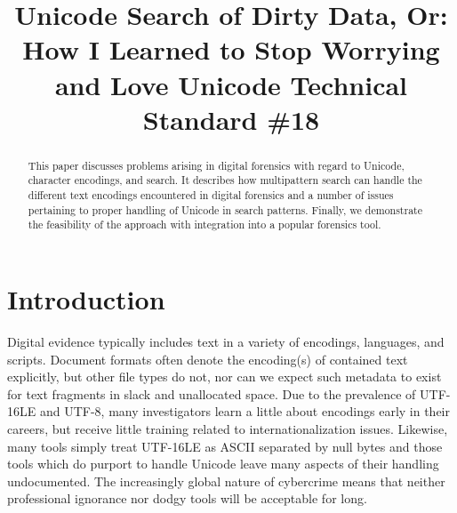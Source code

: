 \documentclass[5p,final,number,sort&compress]{elsarticle}
\begin{document}
\begin{frontmatter}

\title{Unicode Search of Dirty Data, Or:\\ How I Learned to Stop Worrying and Love Unicode Technical Standard \#18}

%
%

\begin{abstract}
This paper discusses problems arising in digital forensics with regard to Unicode, character encodings, and search. It describes how multipattern search can handle the different text encodings encountered in digital forensics and a number of issues pertaining to proper handling of Unicode in search patterns. Finally, we demonstrate the feasibility of the approach with integration into a popular forensics tool.
\end{abstract}

\end{frontmatter}

\section{Introduction}

Digital evidence typically includes text in a variety of encodings, languages, and scripts. Document formats often denote the encoding(s) of contained text explicitly, but other file types do not, nor can we expect such metadata to exist for text fragments in slack and unallocated space. Due to the prevalence of UTF-16LE and UTF-8, many investigators learn a little about encodings early in their careers, but receive little training related to internationalization issues. Likewise, many tools simply treat UTF-16LE as ASCII separated by null bytes and those tools which do purport to handle Unicode leave many aspects of their handling undocumented. The increasingly global nature of cybercrime means that neither professional ignorance nor dodgy tools will be acceptable for long.
\end{document}
